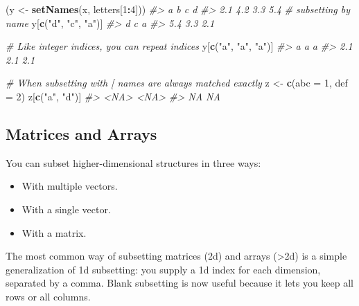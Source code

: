 \documentclass[]{book}
\newenvironment{Shaded}{\begin{snugshade}}{\end{snugshade}}
\newcommand{\CommentTok}[1]{\textcolor[rgb]{0.56,0.35,0.01}{\textit{#1}}}
\newcommand{\DataTypeTok}[1]{\textcolor[rgb]{0.13,0.29,0.53}{#1}}
\newcommand{\DecValTok}[1]{\textcolor[rgb]{0.00,0.00,0.81}{#1}}
\newcommand{\KeywordTok}[1]{\textcolor[rgb]{0.13,0.29,0.53}{\textbf{#1}}}
\newcommand{\NormalTok}[1]{#1}
\newcommand{\OperatorTok}[1]{\textcolor[rgb]{0.81,0.36,0.00}{\textbf{#1}}}
\newcommand{\StringTok}[1]{\textcolor[rgb]{0.31,0.60,0.02}{#1}}
\providecommand{\tightlist}{%
  \setlength{\itemsep}{0pt}\setlength{\parskip}{0pt}}
\theoremstyle{definition}
\theoremstyle{definition}
\theoremstyle{definition}
\theoremstyle{remark}
\begin{document}
\begin{Shaded}
\begin{Highlighting}[]
\NormalTok{(y <-}\StringTok{ }\KeywordTok{setNames}\NormalTok{(x, letters[}\DecValTok{1}\OperatorTok{:}\DecValTok{4}\NormalTok{]))}
\CommentTok{#>   a   b   c   d }
\CommentTok{#> 2.1 4.2 3.3 5.4}
\CommentTok{# subsetting by name}
\NormalTok{y[}\KeywordTok{c}\NormalTok{(}\StringTok{"d"}\NormalTok{, }\StringTok{"c"}\NormalTok{, }\StringTok{"a"}\NormalTok{)]}
\CommentTok{#>   d   c   a }
\CommentTok{#> 5.4 3.3 2.1}

\CommentTok{# Like integer indices, you can repeat indices}
\NormalTok{y[}\KeywordTok{c}\NormalTok{(}\StringTok{"a"}\NormalTok{, }\StringTok{"a"}\NormalTok{, }\StringTok{"a"}\NormalTok{)]}
\CommentTok{#>   a   a   a }
\CommentTok{#> 2.1 2.1 2.1}

\CommentTok{# When subsetting with [ names are always matched exactly}
\NormalTok{z <-}\StringTok{ }\KeywordTok{c}\NormalTok{(}\DataTypeTok{abc =} \DecValTok{1}\NormalTok{, }\DataTypeTok{def =} \DecValTok{2}\NormalTok{)}
\NormalTok{z[}\KeywordTok{c}\NormalTok{(}\StringTok{"a"}\NormalTok{, }\StringTok{"d"}\NormalTok{)]}
\CommentTok{#> <NA> <NA> }
\CommentTok{#>   NA   NA}
\end{Highlighting}
\end{Shaded}

\hypertarget{matrices-and-arrays-1}{%
\subsection{Matrices and Arrays}\label{matrices-and-arrays-1}}

You can subset higher-dimensional structures in three ways:

\begin{itemize}
\tightlist
\item
  With multiple vectors.
\item
  With a single vector.
\item
  With a matrix.
\end{itemize}

The most common way of subsetting matrices (2d) and arrays
(\textgreater{}2d) is a simple generalization of 1d subsetting: you
supply a 1d index for each dimension, separated by a comma. Blank
subsetting is now useful because it lets you keep all rows or all
columns.
\end{document}
